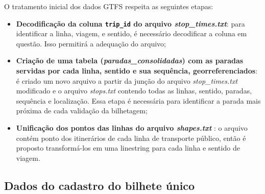 \documentclass[        
    a4paper,          %
    12pt,             %
    chapter=TITLE,    %
    section=Title,    %
    subsection=Title, %
    oneside,          %
    english,          %
    spanish,          %
    brazil,           %
    fleqn             %
]{abntex2}
\let\oldtexttt\texttt
\renewcommand{\texttt}[1]{
  \colorbox{bgcolor}{\oldtexttt{#1}}
}
\begin{document}
  \begin{figure}[!h]
  \captionsetup{width=16cm}
  \centering
  \end{figure}
  
  O tratamento inicial dos dados GTFS respeita as seguintes etapas:
  
  \begin{itemize}
  \tightlist
  \item
    \textbf{Decodificação da coluna \texttt{trip\_id} do arquivo \emph{stop\_times.txt}}: para identificar a linha, viagem, e sentido, é necessário decodificar a coluna em questão. Isso permitirá a adequação do arquivo;
  \item
    \textbf{Criação de uma tabela (\emph{paradas\_consolidadas}) com as paradas servidas por cada linha, sentido e sua sequência, georreferenciados}: é criado um novo arquivo a partir da junção do arquivo \emph{stop\_times.txt} modificado e o arquivo \emph{stops.txt} contendo todas as linhas, sentido, paradas, sequência e localização. Essa etapa é necessária para identificar a parada mais próxima de cada validação da bilhetagem;
  \item
    \textbf{Unificação dos pontos das linhas do arquivo \emph{shapes.txt} }: o arquivo contém ponto dos itinerários de cada linha de transporte público, então é proposto transformá-los em uma linestring para cada linha e sentido de viagem.
  \end{itemize}
  
  \hypertarget{dados-do-cadastro-do-bilhete-unico}{%
  \subsection{Dados do cadastro do bilhete único}\label{dados-do-cadastro-do-bilhete-unico}}
  
\end{document}

